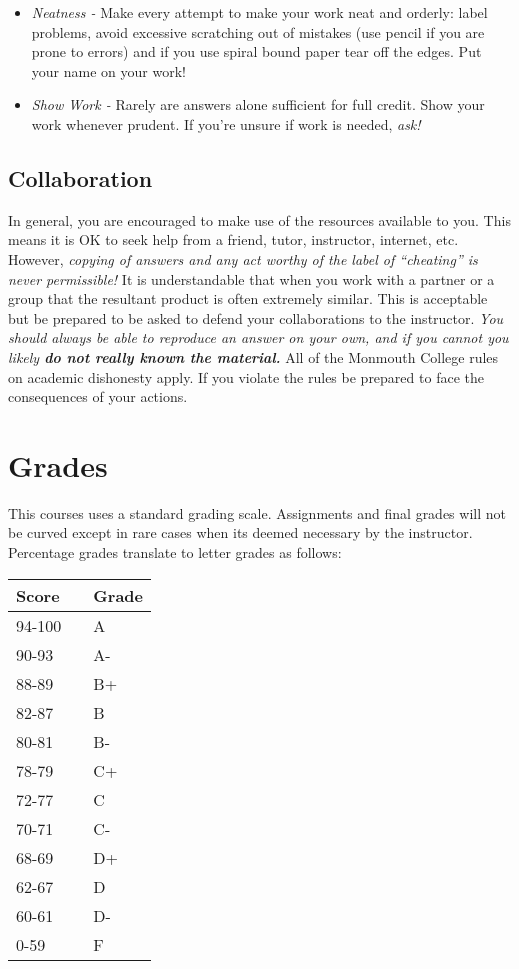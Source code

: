 \documentclass[10pt]{article}
\begin{document}
\begin{itemize}
\begin{itemize}
\item \textit{Neatness - }  Make every attempt to make your work neat and orderly:  label problems, avoid excessive scratching out of mistakes (use pencil if you are prone to errors) and if you use spiral bound paper tear off the edges. Put your name on your work!

\item \textit{Show Work - } Rarely are answers alone sufficient for full credit.  Show your work whenever prudent.  If you're unsure if work is needed, \textit{ask!}
\end{itemize}

\end{itemize}


\subsection{Collaboration}

In general, you are encouraged to make use of the resources available to you.  This means it is OK to seek help from a friend, tutor, instructor, internet, etc.  However, \textit{copying of answers and any act worthy of the label of ``cheating'' is never permissible!}  It is understandable that when you work with a partner or a group that the resultant product is often extremely similar.  This is acceptable but be prepared to be asked to defend your collaborations to the instructor.  \textit{You should always be able to reproduce an answer on your own, and if you cannot you likely \textbf{do not really known the material.}} All of the Monmouth College rules on academic dishonesty apply.  If you violate the rules be prepared to face the consequences of your actions.  

\section{Grades}

This courses uses a standard grading scale.  Assignments and final grades will not be curved except in rare cases when its deemed necessary by the instructor.  Percentage grades translate to letter grades as follows:

\begin{center}
\begin{small}
\begin{tabular}{lcl}
Score & & Grade \\ \hline
94-100 & & A \\
90-93 & & A- \\
88-89 & & B+ \\
82-87 & & B \\
80-81 & & B- \\
78-79 & & C+ \\
72-77 & & C \\
70-71 & & C- \\
68-69 & & D+ \\
62-67 & & D \\
60-61 & & D- \\
0-59 & & F 
\end{tabular}
\end{small}
\end{center}
\end{document}
